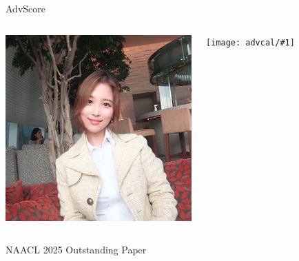 \documentclass[compress]{beamer}
\newcommand{\gfxa}[2]{
	\begin{center}
		\texttt{[image: advcal/\#1]}
	\end{center}
}
\begin{document}
\begin{frame}{AdvScore}
	\begin{columns}
		
		\includegraphics[width=1.0\linewidth]{general_figures/yooyeon}
		\gfxa{advscore_paper}{1.0}
	\end{columns}
\centering
	NAACL 2025 Outstanding Paper
\end{frame}
\end{document}
